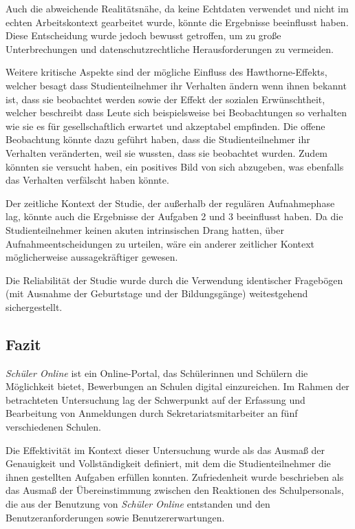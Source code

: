 Auch die abweichende Realitätsnähe, da keine Echtdaten verwendet und nicht im echten Arbeitskontext gearbeitet wurde, könnte die Ergebnisse beeinflusst haben. Diese Entscheidung wurde jedoch bewusst getroffen, um zu große Unterbrechungen und datenschutzrechtliche Herausforderungen zu vermeiden.

Weitere kritische Aspekte sind der mögliche Einfluss des Hawthorne-Effekts, welcher besagt dass Studienteilnehmer ihr Verhalten ändern wenn ihnen bekannt ist, dass sie beobachtet werden\cite{mayo1933human,landsberger1958hawthorne,adair1984hawthorne} sowie der Effekt der sozialen Erwünschtheit, welcher beschreibt dass Leute sich beispielsweise bei Beobachtungen so verhalten wie sie es für gesellschaftlich erwartet und akzeptabel empfinden.\cite{crowne1960scale, fisher1993social,paulhus2002socially} Die offene Beobachtung könnte dazu geführt haben, dass die Studienteilnehmer ihr Verhalten veränderten, weil sie wussten, dass sie beobachtet wurden. Zudem könnten sie versucht haben, ein positives Bild von sich abzugeben, was ebenfalls das Verhalten verfälscht haben könnte.

Der zeitliche Kontext der Studie, der außerhalb der regulären Aufnahmephase lag, könnte auch die Ergebnisse der Aufgaben 2 und 3 beeinflusst haben. Da die Studienteilnehmer keinen akuten intrinsischen Drang hatten, über Aufnahmeentscheidungen zu urteilen, wäre ein anderer zeitlicher Kontext möglicherweise aussagekräftiger gewesen.

Die Reliabilität der Studie wurde durch die Verwendung identischer Fragebögen (mit Ausnahme der Geburtstage und der Bildungsgänge) weitestgehend sichergestellt.

\subsection{Fazit}

\textit{Schüler Online} ist ein Online-Portal, das Schülerinnen und Schülern die Möglichkeit bietet, Bewerbungen an Schulen digital einzureichen. Im Rahmen der betrachteten Untersuchung lag der Schwerpunkt auf der Erfassung und Bearbeitung von Anmeldungen durch Sekretariatsmitarbeiter an fünf verschiedenen Schulen.

Die Effektivität im Kontext dieser Untersuchung wurde als das Ausmaß der Genauigkeit und Vollständigkeit definiert, mit dem die Studienteilnehmer die ihnen gestellten Aufgaben erfüllen konnten. Zufriedenheit wurde beschrieben als das Ausmaß der Übereinstimmung zwischen den Reaktionen des Schulpersonals, die aus der Benutzung von \textit{Schüler Online} entstanden und den Benutzeranforderungen sowie Benutzererwartungen.

